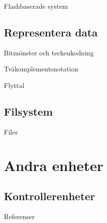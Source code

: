 \documentclass{beamer}
\theoremstyle{definition}
\theoremstyle{remark}
\begin{document}
\begin{frame}{\insertsubsectionhead}{Flashbaserade system}
\end{frame}

\subsection{Representera data}

\begin{frame}{\insertsubsectionhead}{Bitmönster och teckenkodning}
\end{frame}

\begin{frame}{\insertsubsectionhead}{Tvåkomplementsnotation}
\end{frame}

\begin{frame}{\insertsubsectionhead}{Flyttal}
\end{frame}

\subsection{Filsystem}

\begin{frame}{\insertsubsectionhead}{Filer}
\end{frame}


\section{Andra enheter}

\subsection{Kontrollerenheter}

\begin{frame}{\insertsubsectionhead}
\end{frame}



\begin{frame}{Referenser}
  
\end{frame}
\end{document}
